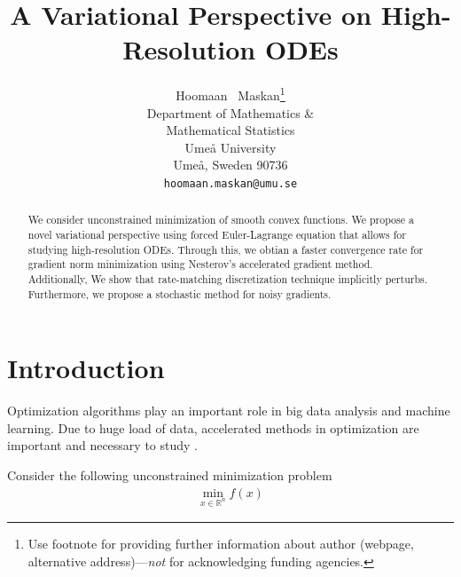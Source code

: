 \documentclass{article}
\title{A Variational Perspective on High-Resolution ODEs}
\author{%
  Hoomaan ~Maskan\thanks{Use footnote for providing further information
    about author (webpage, alternative address)---\emph{not} for acknowledging
    funding agencies.} \\
  Department of Mathematics \& \\Mathematical Statistics\\
  Umeå University\\
  Umeå, Sweden 90736 \\
  \texttt{hoomaan.maskan@umu.se} \\
}
\theoremstyle{plain}
\theoremstyle{definition}
\theoremstyle{remark}
\begin{document}
\maketitle


\begin{abstract}
We consider unconstrained minimization of smooth convex functions. We propose a novel variational perspective using forced Euler-Lagrange equation that allows for studying high-resolution ODEs. Through this, we obtian a faster convergence rate for gradient norm minimization using Nesterov's accelerated gradient method. Additionally, We show that rate-matching discretization technique implicitly perturbs. Furthermore, we propose a stochastic method for noisy gradients. 
\end{abstract}


\section{Introduction}

Optimization algorithms play an important role in big data analysis and machine learning. Due to huge load of data, accelerated methods in optimization are important and necessary to study \citep{Shi2021UnderstandingTA,JMLR:v17:15-084,wilson2021lyapunov,Lessard2016AnalysisAD}. \par
Consider the following unconstrained minimization problem
\begin{align}\label{problem}
    \min_{x\in \mathbb{R}^n} f(x)
\end{align}
\end{document}

